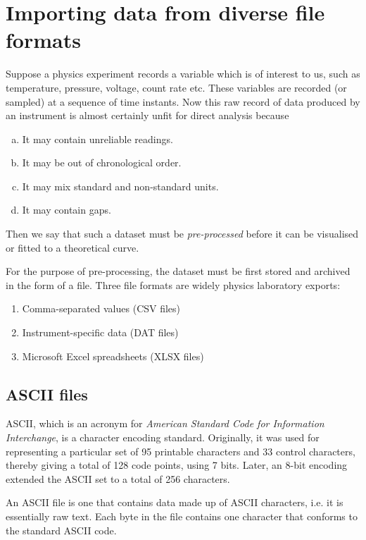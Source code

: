 
\section{Importing data from diverse file formats}
    
    Suppose a physics experiment records a variable which is of interest to us, such as temperature, pressure, voltage, count rate etc. These variables are recorded (or sampled) at a sequence of time instants. Now this raw record of data produced by an instrument is almost certainly unfit for direct analysis because
    \begin{enumerate}[a)]
    	\item It may contain unreliable readings.
    	\item It may be out of chronological order.
    	\item It may mix standard and non-standard units.
    	\item It may contain gaps.
    \end{enumerate}
    Then we say that such a dataset must be \textit{pre-processed} before it can be visualised or fitted to a theoretical curve.
    
    For the purpose of pre-processing, the dataset must be first stored and archived in the form of a file. Three file formats are widely physics laboratory exports:
    \begin{enumerate}
    	\item Comma-separated values (CSV files)
    	\item Instrument-specific data (DAT files)
    	\item Microsoft Excel spreadsheets (XLSX files)
    \end{enumerate}
    
    \subsection{ASCII files}
    	ASCII, which is an acronym for \textit{American Standard Code for Information Interchange}, is a character encoding standard. Originally, it was used for representing a particular set of 95 printable characters and 33 control characters, thereby giving a total of 128 code points, using 7 bits. Later, an 8-bit encoding extended the ASCII set to a total of 256 characters.
    	
    	An ASCII file is one that contains data made up of ASCII characters, i.e. it is essentially raw text. Each byte in the file contains one character that conforms to the standard ASCII code.
    	
